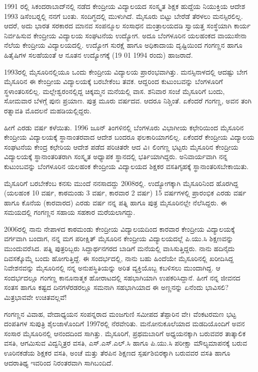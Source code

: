 {1991 ರಲ್ಲಿ ಸಿಕಂದರಾಬಾದ್‍ನಲ್ಲಿ ನಡೆದ ಕೇಂದ್ರೀಯ ವಿದ್ಯಾಲಯದ ಸಂಸ್ಕೃತ ಶಿಕ್ಷಕ ಹುದ್ದೆಯ ನಿಯುಕ್ತಿಯ ಆದೇಶ 1993 ಡಿಸೆಂಬರ್‍ನಲ್ಲಿ ನನಗೆ ಬಂತು. ಸಂದಿಗ್ಧದಲ್ಲಿ ಮುಳುಗಿದೆ. ಮೈಸೂರು ಬಿಟ್ಟು ಬೇರೆಡೆ ತೆರಳಲು ಮನಸ್ಸಿರಲಿಲ್ಲ. ಆದರೆ, ಅದು  ಭಾರತ ಸರಕಾರದ ಮಾನವ ಸಂಪನ್ಮೂಲ ಸಂಸಾಧನ ಮಂತ್ರಾಲಯದಡಿ ಸ್ವಾಯತ್ತ ಸಂಸ್ಥೆಯಾಗಿ ಕಾರ್ಯ ನಿರ್ವಹಿಸುವ ಕೇಂದ್ರೀಯ ವಿದ್ಯಾಲಯ ಸಂಘಟನೆಯ ಉದ್ಯೋಗ. ಅದೂ ಬೆಂಗಳೂರಿನ ಯಲಹಂಕದ ವಾಯುಸೇನಾ ನೆಲೆಯ ಕೇಂದ್ರೀಯ ವಿದ್ಯಾಲಯದಲ್ಲಿ. ಉದ್ಯೋಗ ಸುರಕ್ಷೆ ಹಾಗೂ ಅಧಿಕಾದಾಯ ದೃಷ್ಟಿಯಿಂದ ಗಂಗಣ್ಣನ ಹಾಗೂ ಹಿತೈಷಿಗಳ ಸಲಹೆಯಂತೆ ಆ ನೂತನ ಉದ್ಯೋಗಕ್ಕೆ (19  \enginline{-}  01  \enginline{-}  1994 ರಂದು) ಹಾಜರಾದೆ.

1993ರಲ್ಲಿ ಮೈಸೂರಿನಲ್ಲಿಯೂ ಒಂದು ಕೇಂದ್ರೀಯ ವಿದ್ಯಾಲಯ ಪ್ರಾರಂಭವಾಗಿತ್ತು. ಮನಸ್ಸಿನಾಳದಲ್ಲಿ ಆದಷ್ಟು ಬೇಗ ಮೈಸೂರಿನ ಈ ಕೇಂದ್ರೀಯ ವಿದ್ಯಾಲಯಕ್ಕೆ ಬರಬೇಕೆಂಬ ತವಕ. ಆದ್ದರಿಂದ ಕುಟುಂಬವನ್ನು ಬೆಂಗಳೂರಿಗೆ ಸ್ಥಳಾಂತರಿಸಲಿಲ್ಲ. ಮಲ್ಲೇಶ್ವರಂನಲ್ಲಿದ್ದ ಚಿಕ್ಕಮ್ಮನ ಮನೆಯಲ್ಲಿ ವಾಸ. ಶನಿವಾರ ಸಂಜೆ ಮೈಸೂರಿಗೆ ಬಂದು, ಸೋಮವಾರ ಬೆಳಗ್ಗೆ ಪುನಃ ಪ್ರಯಾಣ. ಪುತ್ರ ಮೂರು ವರ್ಷದವ. ಆದರೂ ನಿಶ್ಚಿಂತೆ. ಏಕೆಂದರೆ ಗಂಗಣ್ಣ, ಅವನ ತಂಗಿ ರತ್ನಾವತಿ ಮೊದಲನೆ ಮಹಡಿಯಲ್ಲಿದ್ದರು.

ಹೀಗೆ ಎರಡು ವರ್ಷ ಕಳೆಯಿತು. 1996 ಜೂನ್ ತಿಂಗಳಿನಲ್ಲಿ ಬೆಂಗಳೂರು ವಿಭಾಗೀಯ ಕಛೇರಿಯಿಂದ ಮೈಸೂರಿನ ಕೇಂದ್ರೀಯ ವಿದ್ಯಾಲಯಕ್ಕೆ ಸ್ಥಾನಾಂತರವಾದ ಆದೇಶ ಬಂದರೂ ಫಲಕಾರಿಯಾಗಲಿಲ್ಲ. ಏಕೆಂದರೆ ಕೇಂದ್ರೀಯ ವಿದ್ಯಾಲಯ ಸಂಘಟನೆಯ ಕೇಂದ್ರ ಕಛೇರಿಯ ಆದೇಶ ಪಡೆದ ಪರಿಚಿತರೇ ಆದ ವಿ। ಲಿಂಗಣ್ಣ ಭಟ್ಟರು ಮೈಸೂರಿನ ಕೇಂದ್ರೀಯ ವಿದ್ಯಾಲಯಕ್ಕೆ ಸ್ಥಾನಾಂತರಿತರಾಗಿ ಸಂಸ್ಕೃತ ಅಧ್ಯಾಪಕ ಸ್ಥಾನದಲ್ಲಿ ಭರ್ತಿಯಾಗಿದ್ದರು. ಅನಿವಾರ್ಯವಾಗಿ ನನ್ನ ಕುಟುಂಬವನ್ನು ಬೆಂಗಳೂರಿನ ಯಲಹಂಕ ಕೇಂದ್ರೀಯ ವಿದ್ಯಾಲಯದ ಶಿಕ್ಷಕರ ವಸತಿಗೃಹಕ್ಕೆ ಸ್ಥಾನಾಂತರಿಸಬೇಕಾಯಿತು.

ಮೈಸೂರಿಗೆ ಬರಬೇಕೆಂಬ ಕನಸು ಮುಂದೆ ನನಸಾದದ್ದು 2008ರಲ್ಲಿ. ಉದ್ಯೋಗಕ್ಕಾಗಿ ಮೈಸೂರಿನಿಂದ ಹೊರಗಿದ್ದ (ಯಲಹಂಕ   \enginline{-}   10 ವರ್ಷ, ಕಾಠಮಂಡು   \enginline{-}   3 ವರ್ಷ, ಕಾರವಾರ   \enginline{-}   2 ವರ್ಷ) 15 ವರ್ಷಗಳಲ್ಲಿ ಪ್ರಾರಂಭಿಕ ಎರಡು ವರ್ಷ ಹಾಗೂ ಕೊನೆಯ (ಕಾರವಾರದ) ಎರಡು ವರ್ಷ ನನ್ನ ಪತ್ನಿ ಹಾಗೂ ಪುತ್ರ ಮೈಸೂರಿನಲ್ಲೇ ನೆಲೆಸಿದ್ದರು. ಈ ಸಮಯದಲ್ಲಿ ಗಂಗಣ್ಣನ ಸಹಾಯ  \enginline{-}  ಸಹಕಾರ ಮರೆಯಲಾಗದ್ದು.

2006ರಲ್ಲಿ ನಾನು ನೇಪಾಳದ ಕಾಠಮಂಡು ಕೇಂದ್ರೀಯ ವಿದ್ಯಾಲಯದಿಂದ ಕಾರವಾರ ಕೇಂದ್ರೀಯ ವಿದ್ಯಾಲಯಕ್ಕೆ ವರ್ಗವಾಗಿ ಬಂದಾಗ, ನನ್ನ ಮಗ ಪರೀಕ್ಷಿತ್ ಮೈಸೂರಿನ ಕೇಂದ್ರೀಯ ವಿದ್ಯಾಲಯದಲ್ಲೆ ಪಿ.ಯು.ಸಿ ಶಿಕ್ಷಣವನ್ನು ಮುಂದುವರೆಸಿದ. ಪತ್ನಿ ಪುತ್ರರಿಬ್ಬರು ಸಿದ್ದಾರ್ಥನಗರದ ಬಾಡಿಗೆ ಮನೆಯಲ್ಲಿ ವಾಸಿಸುತ್ತಿದ್ದರು. ನಾನು ಹದಿನೈದು ದಿವಸಕ್ಕೊಮ್ಮೆ ಬಂದು  \enginline{-}  ಹೋಗುತ್ತಿದ್ದೆ. ಈ ಸಂದರ್ಭದಲ್ಲಿ, ನಾನು ಬಹು ಹಿಂದೆಯೇ ಮೈಸೂರಿನಲ್ಲಿ ಖರೀದಿಸಿದ್ದ ನಿವೇಶನವನ್ನು ಮೈಸೂರಿನಲ್ಲಿ ನನ್ನ ಅನುಪಸ್ಥಿತಿಯನ್ನು ಅರಿತ ವ್ಯಕ್ತಿಯೊಬ್ಬ ಕಬಳಿಸಲು ಮುಂದಾಗಿದ್ದ. ಆ ಸಂದರ್ಭದಲ್ಲೂ ಗಂಗಣ್ಣ ಕಾನೂನಾತ್ಮಕ ಹೋರಾಟದಲ್ಲಿ ಸಹಭಾಗಿಯಾಗಿ ಉಪಕರಿಸಿದ್ದಾನೆ. ಹೀಗೆ ನನ್ನ ಜೀವನದ ಸಂತಸ ಹಾಗೂ ಕಷ್ಟದ ದಿನಗಳೆರಡರಲ್ಲೂ ಸಮನಾಗಿ ಸಹಭಾಗಿಯಾದ ಈ ಅಣ್ಣನನ್ನು ಏನೆಂದು ಭಾವಿಸಲಿ? ಮಿತ್ರಭಾವವೇ ಉಚಿತವಲ್ಲವೆ!

ಗಂಗಣ್ಣನ ವಿವಾಹ, ವೇದಾಧ್ಯಯನ ಸಂಪನ್ನರಾದ ಮಂಜಗುಣಿ ಸಮೀಪದ ತೆಪ್ಪಾರಿನ ವೇ। ವೆಂಕಟರಮಣ ಭಟ್ಟ ದಂಪತಿಗಳ ಸುಪುತ್ರಿ ಶೈಲಜಾಳೊಂದಿಗೆ 1997ರಲ್ಲಿ ನೆರವೇರಿತು. ಮನೋನುಕೂಲೆಯಾದ ಮಡದಿಯೊಂದಿಗೆ ಅವನ ಸಂಸಾರ ಮೈಸೂರಿನಲ್ಲಿ ಆನಂದದಿಂದ ಸಾಗಿತ್ತು. ಮೈಸೂರಿಗೆ, ಪ್ರಥಮಬಾರಿಗೆ ಅಧ್ಯಯನಕ್ಕಾಗಿ ಬರುವವರ ತಾತ್ಕಾಲಿಕ ವಸತಿ, ಆಗಮಿಸುವ ವಿದ್ವನ್ಮಿತ್ರರ ವಸತಿ, ಎಸ್.ಎಸ್.ಎಲ್.ಸಿ ಹಾಗೂ ಪಿ.ಯು.ಸಿ ಪರೀಕ್ಷಾ ಮೌಲ್ಯಮಾಪನಕ್ಕೆ ಬರುವ ಊರಿನಕಡೆಯ ಶಿಕ್ಷಕರ ವಸತಿ, ಅಂಚೆ ಮತ್ತು ತೆರಪಿನ ಶಿಕ್ಷಣದ ಸ್ಪರ್ಷಶಿಬಿರಕ್ಕಾಗಿ ಬರುವವರ ವಸತಿ ಹಾಗೂ ಆದರಾತಿಥ್ಯ ಇವರಿಂದ ನಿರಂತರವಾಗಿ ಸಾಗಿಬಂದಿದೆ.

}

